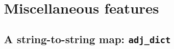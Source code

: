 \chapter{Miscellaneous features}
\section{A string-to-string map: \texttt{adj_dict}} \label{api:adj_dict} 
